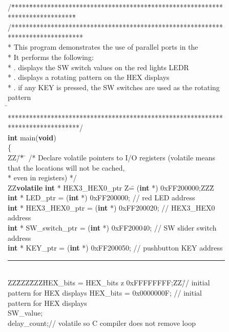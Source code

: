 \newpage
\begin{figure}[h!]
\begin{center}
\begin{minipage}[t]{12.5 cm}
\begin{tabbing}
/\=*****\=*********************************\=****************************************\=\kill
/********************************************************************************\\
\>* This program demonstrates the use of parallel ports in the \systemName\\
\>* It performs the following: \\
\>* . displays the SW switch values on the red lights LEDR\\
\>* . displays a rotating pattern on the HEX displays\\
\>* . if any KEY is pressed, the SW switches are used as the rotating pattern\\
\=\kill
\>********************************************************************************/\\
{\bf int} main({\bf void})\\
\{\\
ZZ\=/\=* \=\kill
\>/* Declare volatile pointers to I/O registers (volatile means that the locations will
not be cached,\\
\>\>* even in registers) */\\
ZZ\={\bf volatile} {\bf int} * HEX3\_HEX0\_ptr	Z\== ({\bf int} *) 0xFF200000;ZZZ\=\kill
{} {\bf int} * LED\_ptr \>= ({\bf int} *) 0xFF200000; \>// red LED address\\
 {\bf int} * HEX3\_HEX0\_ptr	\>= ({\bf int} *) 0xFF200020; \>// HEX3\_HEX0 address\\
 {\bf int} * SW\_switch\_ptr	\>= ({\bf int} *) 0xFF200040; \>// SW slider switch address\\
 {\bf int} * KEY\_ptr \>= ({\bf int} *) 0xFF200050;	\>// pushbutton KEY address\\
\rule{6.0in}{0in}~\\
ZZ\=ZZZ\=ZZZ\=HEX\_bits = HEX\_bits z 0xFFFFFFFF;ZZ\=// initial pattern for HEX displays\kill
{} HEX\_bits = 0x0000000F; \>\>\>// initial pattern for HEX displays\\
 SW\_value;\\
 delay\_count;\>\>\>// volatile so C compiler does not remove loop\\
~\\

\end{tabbing}
\end{minipage}
\end{center}
\end{figure}
